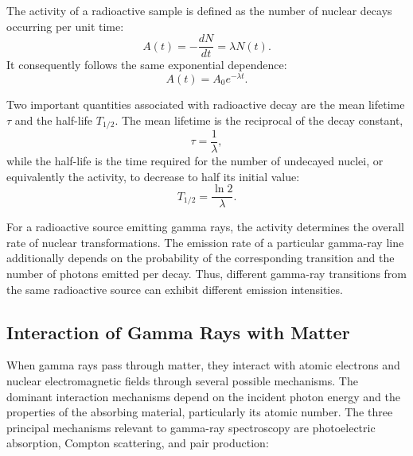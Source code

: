 The activity of a radioactive sample is defined as the number of nuclear decays occurring per unit time:
\begin{equation}
    A(t)=-\frac{dN}{dt}=\lambda N(t).
\end{equation}
It consequently follows the same exponential dependence:
\begin{equation}
    A(t)=A_0e^{-\lambda t}.
\end{equation}

Two important quantities associated with radioactive decay are the mean lifetime $\tau$ and the half-life $T_{1/2}$. The mean lifetime is the reciprocal of the decay constant,
\begin{equation}
    \tau=\frac{1}{\lambda},
\end{equation}
while the half-life is the time required for the number of undecayed nuclei, or equivalently the activity, to decrease to half its initial value:
\begin{equation}
    T_{1/2}=\frac{\ln 2}{\lambda}.
\end{equation}

For a radioactive source emitting gamma rays, the activity determines the overall rate of nuclear transformations. The emission rate of a particular gamma-ray line additionally depends on the probability of the corresponding transition and the number of photons emitted per decay. Thus, different gamma-ray transitions from the same radioactive source can exhibit different emission intensities.

\subsection{Interaction of Gamma Rays with Matter}

When gamma rays pass through matter, they interact with atomic electrons and nuclear electromagnetic fields through several possible mechanisms. The dominant interaction mechanisms depend on the incident photon energy and the properties of the absorbing material, particularly its atomic number. The three principal mechanisms relevant to gamma-ray spectroscopy are photoelectric absorption, Compton scattering, and pair production:

